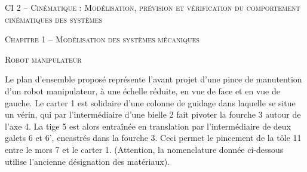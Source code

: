 \documentclass[11pt,oneside]{article}
\begin{document}
\pagestyle{fancy}
\renewcommand{\headrulewidth}{0pt}

\fancyhead{}

\fancyhead[C]{\rule{12cm}{.5pt}}


\renewcommand{\footrulewidth}{0.2pt}

\fancyfoot[C]{\footnotesize{\bfseries \thepage}}



\begin{center}
 \huge\textsc{CI 2 -- Cinématique : Modélisation, prévision et vérification du comportement cinématiques des systèmes}
\end{center}

\begin{center}
 \LARGE\textsc{Chapitre 1 -- Modélisation des systèmes mécaniques} 
\end{center}

\begin{center}
 \large\textsc{Robot manipulateur} 
\end{center}

Le plan d'ensemble proposé représente l'avant projet d'une pince de manutention d'un robot manipulateur, à une échelle réduite, en vue de face et en vue de gauche.
Le carter 1 est solidaire d’une colonne de guidage dans laquelle se situe un vérin, qui par l’intermédiaire d’une bielle 2 fait pivoter la fourche 3 autour de l’axe 4. La tige 5 est alors entraînée en translation par l’intermédiaire de deux galets 6 et 6’, encastrés dans la fourche 3. Ceci permet le pincement de la tôle 11 entre le mors 7 et le carter 1. (Attention, la nomenclature donnée ci-dessous utilise l’ancienne désignation des matériaux).
\end{document}
